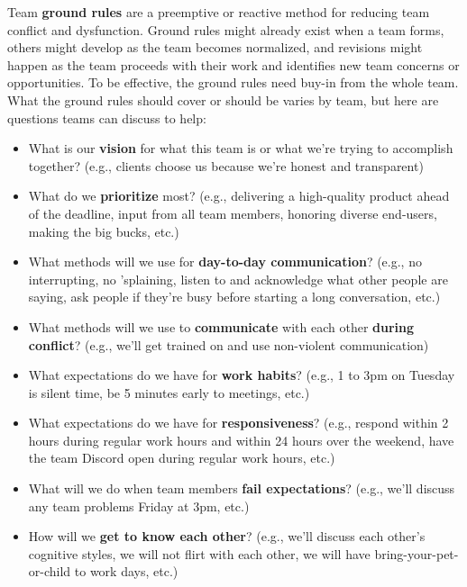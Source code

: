 Team \textbf{ground rules} are a preemptive or reactive method for reducing team conflict and dysfunction. Ground rules might already exist when a team forms, others might develop as the team becomes normalized, and revisions might happen as the team proceeds with their work and identifies new team concerns or opportunities. To be effective, the ground rules need buy-in from the whole team. What the ground rules should cover or should be varies by team, but here are questions teams can discuss to help:
\begin{itemize}
    \item \marginpar{\groundRulesDef\margindivider}What is our \textbf{vision} for what this team is or what we're trying to accomplish together? (e.g., clients choose us because we're honest and transparent)
    \item What do we \textbf{prioritize} most? (e.g., delivering a high-quality product ahead of the deadline, input from all team members, honoring diverse end-users, making the big bucks, etc.)
    \item What methods will we use for \textbf{day-to-day communication}? (e.g., no interrupting, no 'splaining, listen to and acknowledge what other people are saying, ask people if they're busy before starting a long conversation, etc.)
    \item What methods will we use to \textbf{communicate} with each other \textbf{during} \textbf{conflict}? (e.g., we'll get trained on and use non-violent communication)
    \item What expectations do we have for \textbf{work habits}? (e.g., 1 to 3pm on Tuesday is silent time, be 5 minutes early to meetings, etc.)
    \item What expectations do we have for \textbf{responsiveness}? (e.g., respond within 2 hours during regular work hours and within 24 hours over the weekend, have the team Discord open during regular work hours, etc.)
    \item What will we do when team members \textbf{fail expectations}? (e.g., we'll discuss any team problems Friday at 3pm, etc.)
    \item How will we \textbf{get to know each other}? (e.g., we'll discuss each other's cognitive styles, we will not flirt with each other, we will have bring-your-pet-or-child to work days, etc.)
\end{itemize}

